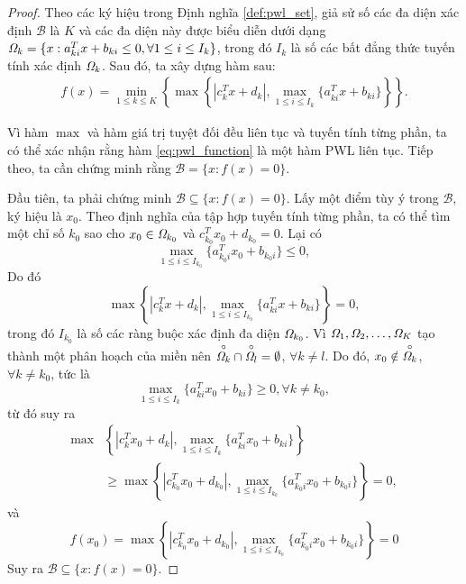 \begin{proof}
    Theo các ký hiệu trong Định nghĩa \ref{def:pwl_set}, giả sử số các đa diện xác định \( \mathcal{B} \) là \( K \) và các đa diện này được biểu diễn dưới dạng \( \mathit{\Omega}_k = \{ x : a_{ki}^T x + b_{ki} \leq 0, \forall 1 \leq i \leq I_k \} \), trong đó \( I_k \) là số các bất đẳng thức tuyến tính xác định \( \mathit{\Omega}_k \). Sau đó, ta xây dựng hàm sau:
    \begin{align}
        f(x) = \min_{1 \leq k \leq K} \left\{ \max \left\{|c_k^T x + d_k|, \max_{1 \leq i \leq I_k} \{ a_{ki}^T x + b_{ki} \} \right\} \right\}.
        \label{eq:pwl_function}
    \end{align}
    
    Vì hàm \( \max \) và hàm giá trị tuyệt đối đều liên tục và tuyến tính từng phần, ta có thể xác nhận rằng hàm \eqref{eq:pwl_function} là một hàm PWL liên tục. Tiếp theo, ta cần chứng minh rằng \( \mathcal{B} = \{ x : f(x) = 0 \} \).

    Đầu tiên, ta phải chứng minh \( \mathcal{B} \subseteq \{ x : f(x) = 0 \} \). Lấy một điểm tùy ý trong \( \mathcal{B} \), ký hiệu là \( x_0 \). Theo định nghĩa của tập hợp tuyến tính từng phần, ta có thể tìm một chỉ số \( k_0 \) sao cho \( x_0 \in \mathit{\Omega}_{k_0} \) và \( c_{k_0}^T x_0 + d_{k_0} = 0 \). Lại có
    \[
    \max_{1 \leq i \leq I_{k_0}} \{ a_{k_0i}^T x_0 + b_{k_0i} \} \leq 0,
    \]
    Do đó
    \[
        \max \left\{|c_k^T x + d_k|, \max_{1 \leq i \leq I_{k_0}} \{ a_{ki}^T x + b_{ki} \} \right\} = 0,
    \]
    trong đó \(I_{k_0}\) là số các ràng buộc xác định đa diện \(\mathit{\Omega}_{k_0}\). Vì \( \mathit{\Omega}_1, \mathit{\Omega}_2, \ldots, \mathit{\Omega}_K \) tạo thành một phân hoạch của miền nên \( \overset{\circ}{\mathit{\Omega}_k} \cap \overset{\circ}{\mathit{\Omega}_l}= \emptyset \), \( \forall k \neq l\). Do đó, \( x_0 \notin \overset{\circ}{\mathit{\Omega}_k} \), \( \forall k \neq k_0 \), tức là
    \[
    \max_{1 \leq i \leq I_k} \{ a_{ki}^T x_0 + b_{ki} \} \geq 0, \forall k \neq k_0,
    \]
    từ đó suy ra
    \begin{align*}
        \max &\left\{|c_k^T x_0 + d_k|, \max_{1 \leq i \leq I_k} \{ a_{ki}^T x_0 + b_{ki} \} \right\} \\
    &\geq \max \left\{|c_{k_0}^T x_0 + d_{k_0}|, \max_{1 \leq i \leq I_{k_0}} \{ a_{k_0i}^T x_0 + b_{k_0i} \} \right\} = 0,
    \end{align*}
    và
    \[
    f(x_0) = \max \left\{ |c_{k_0}^T x_0 + d_{k_0}|, \max_{1 \leq i \leq I_{k_0}} \{ a_{k_0i}^T x_0 + b_{k_0i} \} \right\} = 0 
    \]
    Suy ra \( \mathcal{B} \subseteq \{ x : f(x) = 0 \} \).


\end{proof}
